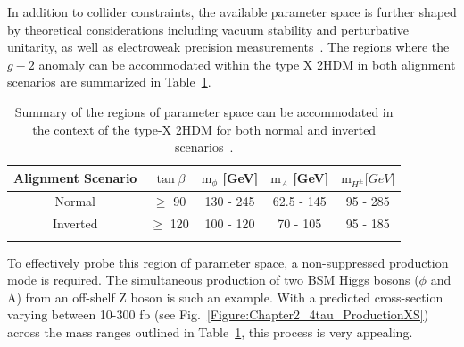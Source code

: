 In addition to collider constraints, the available parameter space is further shaped by theoretical considerations including vacuum stability and perturbative unitarity, as well as electroweak precision measurements~\cite{TypeX_2HDM}. The regions where the $g-2$ anomaly can be accommodated within the type X 2HDM in both alignment scenarios are summarized in Table~\ref{Table:Chapter2_TypeX-ParameterSpace}.

\begin{table}[h]
\centering
\renewcommand{\arraystretch}{1.5} %
\setlength{\tabcolsep}{12pt} %
\begin{tabular}{|c|c|c|c|c|}
\hline
Alignment Scenario & $\tan{\beta}$ & $\text{m}_\phi$ {[}GeV{]} & $\text{m}_A$ {[}GeV{]} & $\text{m}_{H^\pm} {[}GeV{]}$ \\ \hline \hline
Normal             & $\geq$ 90     & 130 - 245                 & 62.5 - 145             & 95 - 285                     \\ \arrayrulecolor{lightgray} \hline
Inverted           & $\geq$ 120    & 100 - 120                 & 70 - 105               & 95 - 185 \\ \arrayrulecolor{black} \hline
\end{tabular}
\caption{Summary of the regions of parameter space can be accommodated in the context of the type-X 2HDM for both normal and inverted scenarios~\cite{TypeX_2HDM}.}
\label{Table:Chapter2_TypeX-ParameterSpace}
\end{table}

To effectively probe this region of parameter space, a non-suppressed production mode is required. The simultaneous production of two BSM Higgs bosons ($\phi$ and A) from an off-shelf Z boson is such an example. With a predicted cross-section varying between 10-300 fb (see Fig.~\ref{Figure:Chapter2_4tau_ProductionXS}) across the mass ranges outlined in Table~\ref{Table:Chapter2_TypeX-ParameterSpace}, this process is very appealing. 

